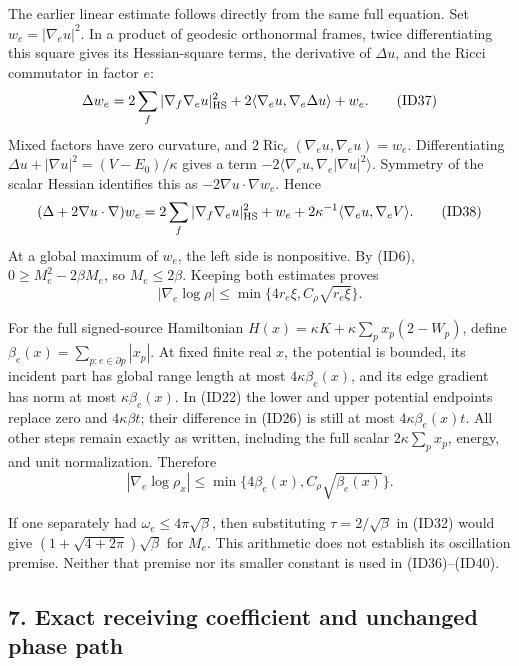 \documentclass[11pt]{article}
\begin{document}
The earlier linear estimate follows directly from the same full equation. Set \(w_e=|\nabla_eu|^2\). In a product of geodesic orthonormal frames, twice differentiating this square gives its Hessian-square terms, the derivative of \(\Delta u\), and the Ricci commutator in factor \(e\):
\[
 \Delta w_e=2\sum_f|\nabla_f\nabla_eu|_{\rm HS}^2
           +2\langle\nabla_eu,\nabla_e\Delta u\rangle+w_e.
 \tag{ID37}
\]
Mixed factors have zero curvature, and \(2\operatorname{Ric}_e(\nabla_eu,\nabla_eu)=w_e\). Differentiating \(\Delta u+|\nabla u|^2=(V-E_0)/\kappa\) gives a term \(-2\langle\nabla_eu,\nabla_e|\nabla u|^2\rangle\). Symmetry of the scalar Hessian identifies this as \(-2\nabla u\cdot\nabla w_e\). Hence
\[
 (\Delta+2\nabla u\cdot\nabla)w_e
 =2\sum_f|\nabla_f\nabla_eu|_{\rm HS}^2+w_e
       +2\kappa^{-1}\langle\nabla_eu,\nabla_eV\rangle.
 \tag{ID38}
\]
At a global maximum of \(w_e\), the left side is nonpositive. By (ID6), \(0\ge M_e^2-2\beta M_e\), so \(M_e\le2\beta\). Keeping both estimates proves
\[
 |\nabla_e\log\rho|\le\min\{4r_e\xi,C_\rho\sqrt{r_e\xi}\}.
 \tag{ID39}
\]

For the full signed-source Hamiltonian \(H(x)=\kappa K+\kappa\sum_px_p(2-W_p)\), define \(\beta_e(x)=\sum_{p:e\in\partial p}|x_p|\). At fixed finite real \(x\), the potential is bounded, its incident part has global range length at most \(4\kappa\beta_e(x)\), and its edge gradient has norm at most \(\kappa\beta_e(x)\). In (ID22) the lower and upper potential endpoints replace zero and \(4\kappa\beta t\); their difference in (ID26) is still at most \(4\kappa\beta_e(x)t\). All other steps remain exactly as written, including the full scalar \(2\kappa\sum_px_p\), energy, and unit normalization. Therefore
\[
 |\nabla_e\log\rho_x|
      \le\min\{4\beta_e(x),C_\rho\sqrt{\beta_e(x)}\}.
 \tag{ID40}
\]

If one separately had \(\omega_e\le4\pi\sqrt\beta\), then substituting \(\tau=2/\sqrt\beta\) in (ID32) would give \((1+\sqrt{4+2\pi})\sqrt\beta\) for \(M_e\). This arithmetic does not establish its oscillation premise. Neither that premise nor its smaller constant is used in (ID36)–(ID40).

\subsection*{7. Exact receiving coefficient and unchanged phase path}
\end{document}
